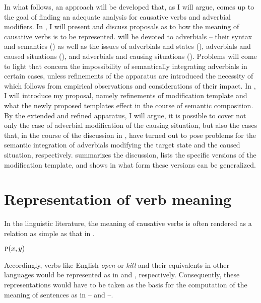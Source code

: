\documentclass[output=paper]{langscibook}
\begin{document}
In what follows, an approach will be developed that, as I will argue, comes up to the goal of finding an adequate analysis for causative verbs and adverbial modifiers. In , I will present and discuss proposals as to how the meaning of causative verbs is to be represented.  will be devoted to adverbials -- their syntax and semantics () as well as the issues of adverbials and states (), adverbials and caused situations (), and adverbials and causing situations (). Problems will come to light that concern the impossibility of semantically integrating adverbials in certain cases, unless refinements of the apparatus are introduced the necessity of which follows from empirical observations and considerations of their impact. In , I will introduce my proposal, namely refinements of  modification template and what the newly proposed templates effect in the course of semantic composition. By the extended and refined apparatus, I will argue, it is possible to cover not only the case of adverbial modification of the causing situation, but also the cases that, in the course of the discussion in , have turned out to pose problems for the semantic integration of adverbials modifying the target state and the caused situation, respectively.  summarizes the discussion, lists the specific versions of the modification template, and shows in what form these versions can be generalized.

\section{Representation of verb meaning}
\label{sec:junghanns:2}

In the linguistic literature, the meaning of causative verbs is often rendered as a relation as simple as that in .

\ea%
    \label{ex:junghanns:10}
  $\textsc{p} (x, y)$
\z

\noindent Accordingly, verbs like English \textit{open} or \textit{kill} and their equivalents in other languages would be represented as in  and , respectively. Consequently, these representations would have to be taken as the basis for the computation of the meaning of sentences as in -- and --.
\end{document}
